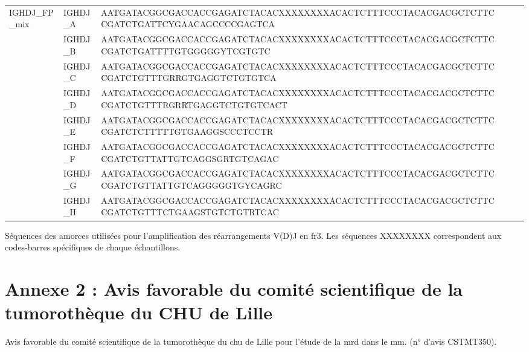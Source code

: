\begin{annex}[htbp]
{\begin{tabular}{lllp{7cm}rr}
IGHDJ\_FP\_mix & IGHDJ\_A & AATGATACGGCGACCACCGAGATCTACACXXXXXXXXACACTCTTTCCCTACACGACGCTCTTCCGATCTGATTCYGAACAGCCCCGAGTCA \\
& IGHDJ\_B & AATGATACGGCGACCACCGAGATCTACACXXXXXXXXACACTCTTTCCCTACACGACGCTCTTCCGATCTGATTTTGTGGGGGYTCGTGTC \\
& IGHDJ\_C & AATGATACGGCGACCACCGAGATCTACACXXXXXXXXACACTCTTTCCCTACACGACGCTCTTCCGATCTGTTTGRRGTGAGGTCTGTGTCA \\
& IGHDJ\_D & AATGATACGGCGACCACCGAGATCTACACXXXXXXXXACACTCTTTCCCTACACGACGCTCTTCCGATCTGTTTRGRRTGAGGTCTGTGTCACT \\
& IGHDJ\_E & AATGATACGGCGACCACCGAGATCTACACXXXXXXXXACACTCTTTCCCTACACGACGCTCTTCCGATCTCTTTTTGTGAAGGSCCCTCCTR \\
& IGHDJ\_F & AATGATACGGCGACCACCGAGATCTACACXXXXXXXXACACTCTTTCCCTACACGACGCTCTTCCGATCTGTTATTGTCAGGSGRTGTCAGAC \\
& IGHDJ\_G & AATGATACGGCGACCACCGAGATCTACACXXXXXXXXACACTCTTTCCCTACACGACGCTCTTCCGATCTGTTATTGTCAGGGGGTGYCAGRC \\
& IGHDJ\_H & AATGATACGGCGACCACCGAGATCTACACXXXXXXXXACACTCTTTCCCTACACGACGCTCTTCCGATCTGTTTCTGAAGSTGTCTGTRTCAC \\

\hline
\end{tabular}
}
\caption{
    Séquences des amorces utilisées pour l'amplification des réarrangements V(D)J en \gls{fr}3.
    Les séquences XXXXXXXX correspondent aux codes-barres spécifiques de chaque échantillons.
    }
\label{anx:primer-sequences}
\end{annex}

\newpage

\section*{Annexe 2 : Avis favorable du comité scientifique de la tumorothèque du CHU de Lille}

\begin{annex}[htbp]
    \begin{center}
        \caption{
            Avis favorable du comité scientifique de la tumorothèque du \gls{chu} de Lille pour l'étude de la \gls{mrd} dans le \gls{mm}.
            (n° d'avis CSTMT350).
        }
        \label{anx:cstmt-mrd-mm}
    \end{center}
\end{annex}